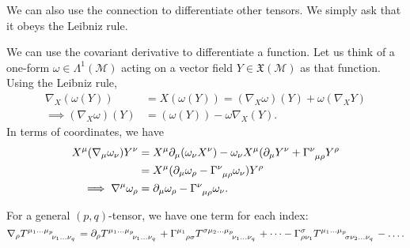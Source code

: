 We can also use the connection to differentiate other tensors. We simply ask that it obeys the Leibniz rule.
\begin{example}[]
  We can use the covariant derivative to differentiate a function. Let us think of a one-form $\omega \in \Lambda^1(\mathcal{M})$ acting on a vector field $Y \in \mathfrak{X}(\mathcal{M})$ as that function. Using the Leibniz rule,
  \begin{align}
    \nabla_X (\omega(Y)) &= X(\omega(Y)) = (\nabla_X \omega)(Y) + \omega (\nabla_X Y) \\
    \implies (\nabla_X \omega) (Y) &= (\omega(Y)) -\omega \nabla_X (Y).
  \end{align}
  In terms of coordinates, we have
  \begin{align}
    X^\mu(\nabla_\mu \omega_\nu) Y^\nu &= X^\mu \partial_\mu (\omega_\nu X^\nu) - \omega_\nu X^\mu (\partial_\mu Y^\nu + \Gamma \indices{^\nu_\mu_\rho} Y^\rho \\
				       &= X^\mu (\partial_\mu \omega_\rho - \Gamma \indices{^\nu_\mu_\rho} \omega_\nu) Y^\rho \\
				       \implies \nabla^\mu \omega_\rho &= \partial_\mu \omega_\rho - \Gamma \indices{^\nu_\mu_\rho} \omega_\nu.
  \end{align}
\end{example}
For a general $(p, q)$-tensor, we have one term for each index:
\begin{equation}
  \nabla_\rho T \indices{^{\mu_1 \dots \mu_p}_{\nu_1 \dots \nu_q}} = \partial_\rho T \indices{^{\mu_1 \dots \mu_p}_{\nu_1 \dots \nu_q}} + \Gamma \indices{^{\mu_1}_\rho_\sigma} T \indices{^{\sigma \mu_2 \dots \mu_p}_{\nu_1 \dots \nu_q}} + \dots - \Gamma^\sigma_{\rho \nu_1} T \indices{^{\mu_1 \dots \mu_p}_{\sigma \nu_2 \dots \nu_q}} - \dots.
\end{equation}


